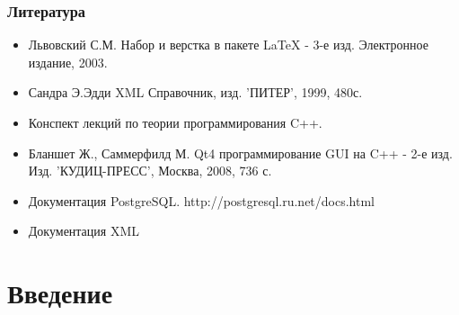 \documentclass[12pt,a4paper,oneside]{article} %
\begin{document}
\subsubsection*{Литература}
\begin{itemize}
\item Львовский С.М. Набор и верстка в пакете LaTeX - 3-е изд. \linebreak
Электронное издание, 2003.
\item Сандра Э.Эдди XML Справочник, изд. 'ПИТЕР', 1999, 480с.
\item Конспект лекций по теории программирования C++.
\item Бланшет Ж., Саммерфилд М. Qt4 программирование GUI на C++ - 2-е изд.\linebreak
Изд. 'КУДИЦ-ПРЕСС', Москва, 2008, 736 с.
\item Документация PostgreSQL. http://postgresql.ru.net/docs.html
\item Документация XML
\end{itemize}
\newpage
\tableofcontents

\newpage
\section{Введение}
\end{document}
